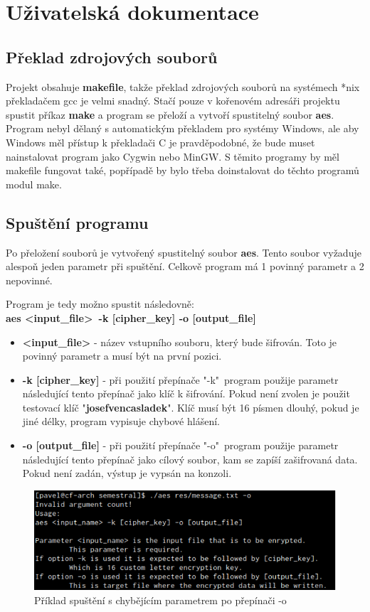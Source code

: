 \documentclass[12pt]{article}
\begin{document}
\section{Uživatelská dokumentace}
\subsection{Překlad zdrojových souborů}
Projekt obsahuje \textbf{makefile}, takže překlad zdrojových souborů na
systémech *nix překladačem gcc je velmi snadný. Stačí pouze v kořenovém
adresáři projektu spustit příkaz \textbf{make} a program se přeloží a
vytvoří spustitelný soubor
\textbf{aes}. Program nebyl dělaný s automatickým překladem pro systémy Windows, ale
aby Windows měl přístup k překladači C je pravděpodobné, že bude muset nainstalovat
program jako Cygwin nebo MinGW. S těmito programy by měl makefile fungovat také, 
popřípadě by bylo třeba doinstalovat do těchto programů modul make.
\subsection{Spuštění programu}
Po přeložení souborů je vytvořený spustitelný soubor \textbf{aes}. Tento soubor 
vyžaduje alespoň jeden parametr při spuštění. Celkově program má 1 povinný
parametr a 2 nepovinné.

Program je tedy možno spustit následovně:\\
\textbf{aes \textless input\_file\textgreater\ -k [cipher\_key] -o [output\_file]}\\
\begin{itemize}
	\item \textbf{\textless input\_file\textgreater} - název vstupního souboru,
		který bude šifrován. Toto je povinný parametr a musí být na první
		pozici.
	\item \textbf{-k [cipher\_key]} - při použití přepínače "-k"\ 
		program použije parametr následující tento přepínač jako klíč k 
		šifrování. Pokud není zvolen je použit
		testovací klíč "\textbf{josefvencasladek}". Klíč musí být 16
		písmen dlouhý, pokud je jiné délky, program vypisuje chybové
		hlášení.
	\item \textbf{-o [output\_file]} - při použití přepínače "-o"\ 
		program použije parametr následující tento přepínač jako
		cílový soubor, kam se zapíší zašifrovaná
		data. Pokud není zadán, výstup je vypsán na konzoli.
\end{itemize}
\begin{figure} [ht]
	\centering
	\includegraphics[width=\textwidth]{img/aes_arg_err.pdf}
	\caption{Příklad spuštění s chybějícím parametrem po přepínači -o}
	\label{fig:aes_arg_err}
\end{figure}
%
%
\end{document}
